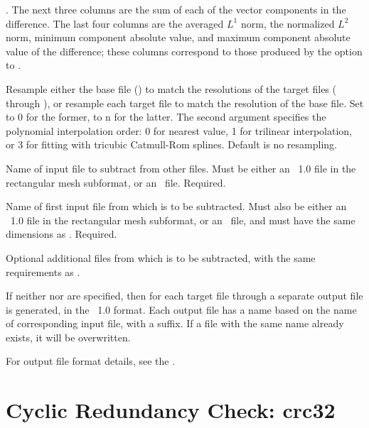 \begin{description}
  .
  The next three columns are the sum of each of the vector components in
  the difference.  The last four columns are the averaged $L^1$ norm,
  the normalized $L^2$ norm, minimum component absolute value, and
  maximum component absolute value of the difference; these columns
  correspond to those produced by the  option to
  .
\item[\optkey{-resample \boa 0\pipe n\bca\  \boa 0\pipe 1\pipe 3\bca}]
  Resample either the base file () to match the resolutions of
  the target files ( through ), or resample each
  target file to match the resolution of the base file.  Set
   to 0 for the former, to n for the latter.  The second
  argument specifies the polynomial interpolation order: 0 for
  nearest value, 1 for trilinear interpolation, or 3 for fitting with
  tricubic Catmull-Rom splines.  Default is no resampling.
\item[\optkey{file-0}]
  Name of input file to subtract from other files.  Must be either
  an \OVF\ 1.0 file in the rectangular mesh subformat, or an \VIO\
  file.  Required.
\item[\optkey{file-1}]
  Name of first input file from which  is to be subtracted.
  Must also be either an \OVF\ 1.0 file in the rectangular mesh
  subformat, or an \VIO\ file, and must have the same dimensions as
  \cd{file-0}.  Required.
\item[\optkey{\ldots\ file-n}]
  Optional additional files from which  is to be
  subtracted, with the same requirements as .
\end{description}

If neither  nor  are specified, then for each target
file \cd{file-1} through \cd{file-n} a separate output file is
generated, in the \OVF\ 1.0 format.  Each output file has a name based
on the name of corresponding input file, with a \cd{-diff} suffix.  If a
file with the same name already exists, it will be overwritten.

For output file format details, see the .

\section{Cyclic Redundancy Check: crc32\label{sec:crc32}}%

